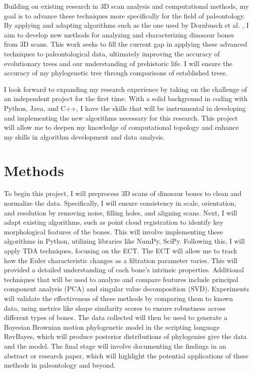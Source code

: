 \documentclass[12pt]{article}
\begin{document}
Building on existing research in 3D scan analysis and computational methods, my
goal is to advance these techniques more specifically for the field of
paleontology. By applying and adapting algorithms such as the one used by
Dornbusch et al. \citep{dornbusch2007}, I aim to develop new methods for analyzing 
and characterizing dinosaur bones from 3D scans. This work seeks to fill the 
current gap in applying these advanced techniques to paleontological data, 
ultimately improving the accuracy of evolutionary trees and our understanding of 
prehistoric life. I will ensure the accuracy of my phylogenetic tree through
comparisons of established trees.

I look forward to expanding my research experience by taking on the challenge of
an independent project for the first time. With a solid background in
coding with Python, Java, and C++, I have the skills that will be instrumental 
in developing and implementing the new algorithms necessary for this research. 
This project will allow me to deepen my knowledge of computational topology and 
enhance my skills in algorithm development and data analysis. 

\section{Methods}
To begin this project, I will preprocess 3D scans of dinosaur bones to clean and
normalize the data. Specifically, I will ensure consistency in scale, orientation, 
and resolution by removing noise, filling holes, and aligning scans.  Next, I 
will adapt existing algorithms, such as point cloud registration to identify key 
morphological features of the bones. This will involve implementing these
algorithms in Python, utilizing libraries like NumPy, SciPy. Following this, 
I will apply TDA techniques, focusing on the ECT. The ECT will
allow me to track how the Euler characteristic changes as a filtration parameter
varies. This will provided a detailed understanding of each bone's intrinsic
properties. Additional techniques that will be used to analyze and compare
features include principal component analysis (PCA) and singular value 
decomposition (SVD). Experiments will validate the effectiveness of these methods 
by comparing them to known data, using metrics like shape similarity scores to 
ensure robustness across different types of bones.
The data collected will then be used to generate a Bayesian Brownian motion
phylogenetic model in the scripting language RevBayes, which will produce
posterior distributions of phylogenies give the data and the model. 
The final stage will involve documenting the findings in an abstract or research 
paper, which will highlight the potential applications of these methods in 
paleontology and beyond.
\end{document}
